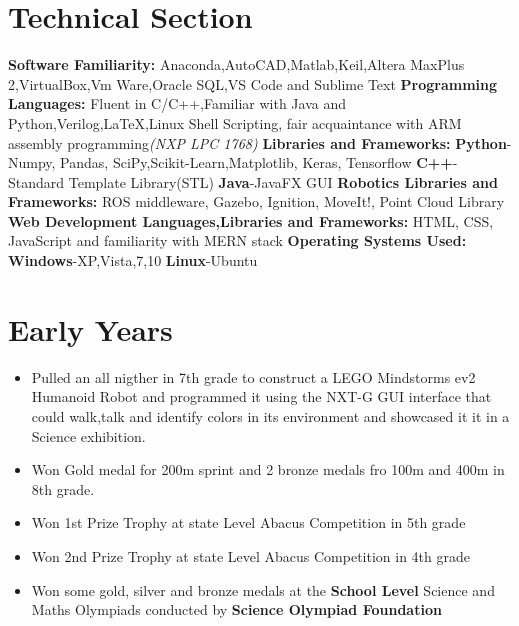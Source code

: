 \documentclass[a4paper,12pt]{article}
\begin{document}
\section*{Technical Section}
\textbf{Software Familiarity: }
\newline
Anaconda,AutoCAD,Matlab,Keil,Altera MaxPlus 2,VirtualBox,Vm Ware,Oracle SQL,VS Code and Sublime Text
\newline
\textbf{Programming Languages: }
\newline
Fluent in C/C++,Familiar with Java and Python,Verilog,LaTeX,Linux Shell Scripting,
fair acquaintance with ARM assembly programming\textit{(NXP LPC 1768)}
\newline
\textbf{Libraries and Frameworks: }
\newline
\textbf{Python}-Numpy, Pandas, SciPy,Scikit-Learn,Matplotlib, Keras, Tensorflow
\newline
\textbf{C++}-Standard Template Library(STL)
\newline
\textbf{Java}-JavaFX GUI
\newline
\textbf{Robotics Libraries and Frameworks: }
\newline
ROS middleware, Gazebo, Ignition, MoveIt!, Point Cloud Library
\newline
\textbf{Web Development Languages,Libraries and Frameworks: }
\newline
HTML, CSS, JavaScript and familiarity with MERN stack
\newline
\textbf{Operating Systems Used: }
\newline
\textbf{Windows}-XP,Vista,7,10
\textbf{Linux}-Ubuntu

\section*{Early Years}
\begin{itemize}
    \item Pulled an all nigther in 7th grade to construct a LEGO Mindstorms ev2
          Humanoid Robot and programmed it using the NXT-G GUI interface that could walk,talk
          and identify colors in its environment and showcased it it in a Science exhibition.
    \item Won Gold medal for 200m sprint and 2 bronze medals fro 100m and 400m in 8th grade.
    \item Won 1st Prize Trophy at state Level Abacus Competition in 5th grade
    \item Won 2nd Prize Trophy at state Level Abacus Competition in 4th grade
    \item Won some gold, silver and bronze medals at the \textbf{School Level}  Science
          and Maths Olympiads conducted by \textbf{Science Olympiad Foundation}
\end{itemize}


\end{document}
